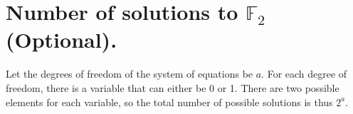 \section{Number of solutions to $\mathbb{F}_2$ (Optional).}
Let the degrees of freedom of the system of equations be $a$.
For each degree of freedom, there is a variable that can either be 0 or 1.
There are two possible elements for each variable, so
the total number of possible solutions is thus $2^a$.